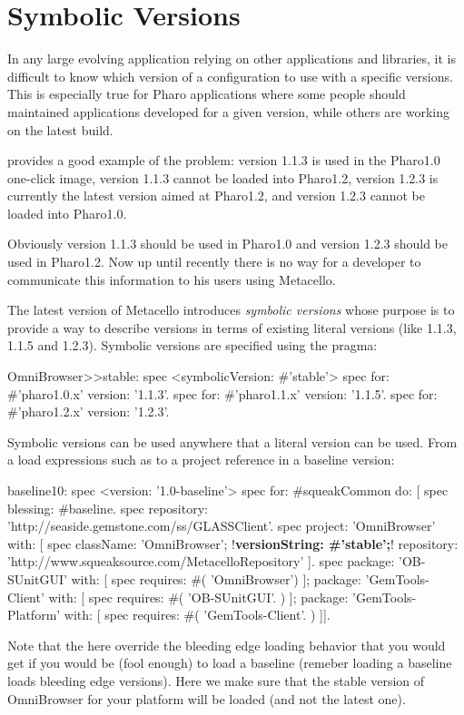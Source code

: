 \documentclass[a4paper,10pt,twoside]{book}
\begin{document}
\section{Symbolic Versions}
In any large evolving application relying on other applications and libraries, it is difficult to know which version of a configuration to use with a specific versions. This is especially true for Pharo applications where some people should maintained applications developed for a given version, while others are working on the latest build.

 provides a good example of the problem: 
version 1.1.3 is used in the Pharo1.0 one-click image,  version 1.1.3 cannot be loaded into Pharo1.2,  version 1.2.3 is currently the latest  version aimed at Pharo1.2, and version 1.2.3 cannot be loaded into Pharo1.0. 

Obviously version 1.1.3 should be used in Pharo1.0 and version 1.2.3 should be used in Pharo1.2. Now up until recently there is no way for a developer to communicate this information to his users using Metacello.

The latest version of Metacello introduces \emph{symbolic versions} whose purpose is to provide a way to describe versions in terms of existing literal versions (like 1.1.3, 1.1.5 and 1.2.3). Symbolic versions are specified using the  pragma:

\begin{code}{}
OmniBrowser>>stable: spec
     <symbolicVersion: #'stable'>
     spec for: #'pharo1.0.x' version: '1.1.3'.
     spec for: #'pharo1.1.x' version: '1.1.5'.
     spec for: #'pharo1.2.x' version: '1.2.3'.
\end{code}

Symbolic versions can be used anywhere that a literal version can be used. From a load expressions such as 
to a project reference in a baseline version:

\begin{code}{}
baseline10: spec
  <version: '1.0-baseline'>
  spec for: #squeakCommon do: [
     spec blessing: #baseline.
     spec repository: 'http://seaside.gemstone.com/ss/GLASSClient'.
     spec
        project: 'OmniBrowser' with: [
          spec
             className: 'OmniBrowser';
             !\textbf{versionString: \#'stable';}!
             repository: 'http://www.squeaksource.com/MetacelloRepository' ].
     spec
         package: 'OB-SUnitGUI' with: [
            spec requires: #( 'OmniBrowser') ];
         package: 'GemTools-Client' with: [
            spec requires: #( 'OB-SUnitGUI'. ) ];
         package: 'GemTools-Platform' with: [
            spec requires: #( 'GemTools-Client'. ) ]].
\end{code}
Note that the  here override the bleeding edge loading behavior that you would get if you would be (fool enough) to load a baseline (remeber loading a baseline loads bleeding edge versions). Here we make sure that the stable version of OmniBrowser for your platform will be loaded (and not the latest one).
    
\end{document}
